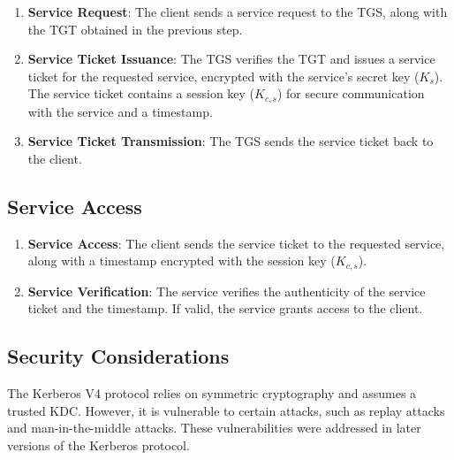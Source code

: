 \documentclass[11pt]{article}
\begin{document}
\begin{enumerate}
    \item \textbf{Service Request}: The client sends a service request to the TGS, along with the TGT obtained in the previous step.
    \item \textbf{Service Ticket Issuance}: The TGS verifies the TGT and issues a service ticket for the requested service, encrypted with the service's secret key ($K_s$). The service ticket contains a session key ($K_{c,s}$) for secure communication with the service and a timestamp.
    \item \textbf{Service Ticket Transmission}: The TGS sends the service ticket back to the client.
\end{enumerate}

\subsection{Service Access}

\begin{enumerate}
    \item \textbf{Service Access}: The client sends the service ticket to the requested service, along with a timestamp encrypted with the session key ($K_{c,s}$).
    \item \textbf{Service Verification}: The service verifies the authenticity of the service ticket and the timestamp. If valid, the service grants access to the client.
\end{enumerate}

\subsection{Security Considerations}

The Kerberos V4 protocol relies on symmetric cryptography and assumes a trusted KDC. However, it is vulnerable to certain attacks, such as replay attacks and man-in-the-middle attacks. These vulnerabilities were addressed in later versions of the Kerberos protocol.
\end{document}
